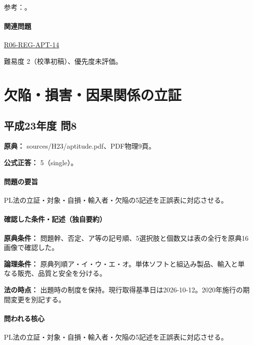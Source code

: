 \par 参考：\cite{pl_statute,pl_qa,pl_definitions2018}。

\paragraph{関連問題} \hyperref[q:r06-reg-apt-14]{R06-REG-APT-14}

\par 難易度 2（校準初稿）、優先度未評価。

\section{欠陥・損害・因果関係の立証}

\subsection{平成23年度 問8}
\label{q:h23-reg-apt-08}

\noindent\textbf{原典：} sources/H23/aptitude.pdf、PDF物理9頁。

\textbf{公式正答：} 5（single）。

\paragraph{問題の要旨} PL法の立証・対象・自損・輸入者・欠陥の5記述を正誤表に対応させる。

\paragraph{確認した条件・記述（独自要約）}\mbox{}\par

\noindent\textbf{原典条件：} 問題幹、否定、ア等の記号順、5選択肢と個数又は表の全行を原典16画像で確認した。\par

\noindent\textbf{論理条件：} 原典列順ア・イ・ウ・エ・オ。単体ソフトと組込み製品、輸入と単なる販売、品質と安全を分ける。\par

\noindent\textbf{法の時点：} 出題時の制度を保持。現行取得基準日は2026-10-12。2020年施行の期間変更を別記する。\par

\paragraph{問われる核心} PL法の立証・対象・自損・輸入者・欠陥の5記述を正誤表に対応させる。

